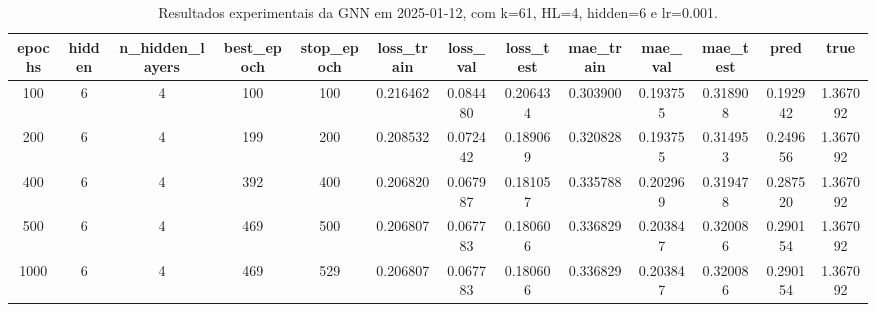\begin{table}[h]
\centering
\caption{Resultados experimentais da GNN em 2025-01-12, com k=61, HL=4, hidden=6 e lr=0.001.}
\label{tab:gnn_results_k61_hl4_h6_d20250112}
\begin{tabular}{ccccccccccccc}
\toprule
epochs & hidden & n\_hidden\_layers & best\_epoch & stop\_epoch & loss\_train & loss\_val & loss\_test & mae\_train & mae\_val & mae\_test & pred & true \\
\midrule
100 & 6 & 4 & 100 & 100 & 0.216462 & 0.084480 & 0.206434 & 0.303900 & 0.193755 & 0.318908 & 0.192942 & 1.367092 \\
200 & 6 & 4 & 199 & 200 & 0.208532 & 0.072442 & 0.189069 & 0.320828 & 0.193755 & 0.314953 & 0.249656 & 1.367092 \\
400 & 6 & 4 & 392 & 400 & 0.206820 & 0.067987 & 0.181057 & 0.335788 & 0.202969 & 0.319478 & 0.287520 & 1.367092 \\
500 & 6 & 4 & 469 & 500 & 0.206807 & 0.067783 & 0.180606 & 0.336829 & 0.203847 & 0.320086 & 0.290154 & 1.367092 \\
1000 & 6 & 4 & 469 & 529 & 0.206807 & 0.067783 & 0.180606 & 0.336829 & 0.203847 & 0.320086 & 0.290154 & 1.367092 \\
\bottomrule
\end{tabular}
\end{table}
